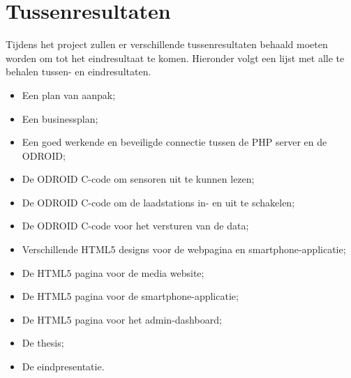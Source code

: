 \section{Tussenresultaten}

Tijdens het project zullen er verschillende tussenresultaten behaald moeten worden om tot het eindresultaat te komen. Hieronder volgt een lijst met alle te behalen tussen- en eindresultaten.


\begin{itemize}

\item
Een plan van aanpak;

\item
Een businessplan;

\item
Een goed werkende en beveiligde connectie tussen de PHP server en de ODROID;

\item
De ODROID C-code om sensoren uit te kunnen lezen;

\item
De ODROID C-code om de laadstations in- en uit te schakelen;

\item
De ODROID C-code voor het versturen van de data;

\item
Verschillende HTML5 designs voor de webpagina en smartphone-applicatie;

\item
De HTML5 pagina voor de media website;

\item
De HTML5 pagina voor de smartphone-applicatie;

\item
De HTML5 pagina voor het admin-dashboard;

\item
De thesis;

\item
De eindpresentatie.


\end{itemize}